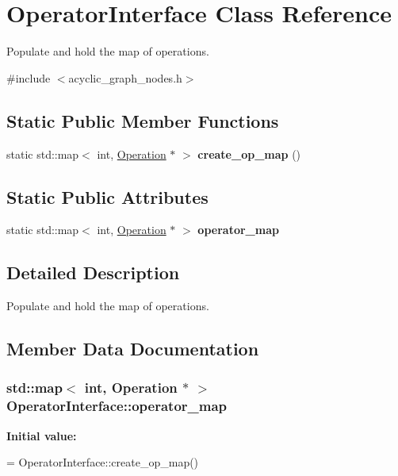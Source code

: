 \hypertarget{classOperatorInterface}{}\section{Operator\+Interface Class Reference}
\label{classOperatorInterface}


Populate and hold the map of operations.  




{\ttfamily \#include $<$acyclic\+\_\+graph\+\_\+nodes.\+h$>$}

\subsection*{Static Public Member Functions}
\begin{DoxyCompactItemize}
\item 
static std\+::map$<$ int, \hyperlink{classOperation}{Operation} $\ast$ $>$ {\bfseries create\+\_\+op\+\_\+map} ()\hypertarget{classOperatorInterface_ab9027be9ca1976893ed083b05c067d13}{}\label{classOperatorInterface_ab9027be9ca1976893ed083b05c067d13}

\end{DoxyCompactItemize}
\subsection*{Static Public Attributes}
\begin{DoxyCompactItemize}
\item 
static std\+::map$<$ int, \hyperlink{classOperation}{Operation} $\ast$ $>$ {\bfseries operator\+\_\+map}
\end{DoxyCompactItemize}


\subsection{Detailed Description}
Populate and hold the map of operations. 

\subsection{Member Data Documentation}
\subsubsection[{\texorpdfstring{operator\+\_\+map}{operator_map}}]{\setlength{\rightskip}{0pt plus 5cm}std\+::map$<$ int, {\bf Operation} $\ast$ $>$ Operator\+Interface\+::operator\+\_\+map\hspace{0.3cm}{\ttfamily [static]}}\hypertarget{classOperatorInterface_a90337c660b5c440182b4d7bcd2b49e61}{}\label{classOperatorInterface_a90337c660b5c440182b4d7bcd2b49e61}
{\bfseries Initial value\+:}
\begin{DoxyCode}
=
  OperatorInterface::create\_op\_map()
\end{DoxyCode}



